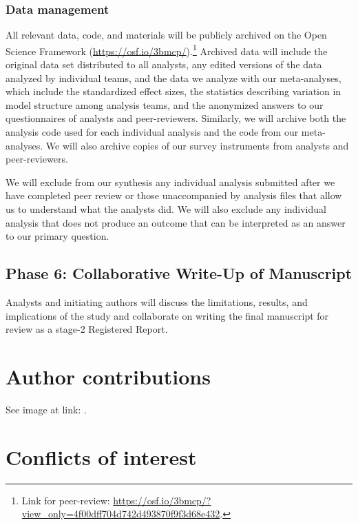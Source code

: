 \documentclass[Review,times,sageh]{sagej}
\begin{document}
\hypertarget{ana-archive}{%
\subsubsection{Data management}\label{ana-archive}}

All relevant data, code, and materials will be publicly archived on the Open Science Framework (\url{https://osf.io/3bmcp/}).\footnote{Link for peer-review: \url{https://osf.io/3bmcp/?view_only=4f00dff704d742d493870f9f3d68e432}.}
Archived data will include the original data set distributed to all analysts, any edited versions of the data analyzed by individual teams, and the data we analyze with our meta-analyses, which include the standardized effect sizes, the statistics describing variation in model structure among analysis teams, and the anonymized answers to our questionnaires of analysts and peer-reviewers.
Similarly, we will archive both the analysis code used for each individual analysis and the code from our meta-analyses.
We will also archive copies of our survey instruments from analysts and peer-reviewers.

We will exclude from our synthesis any individual analysis submitted after we have completed peer review or those unaccompanied by analysis files that allow us to understand what the analysts did.
We will also exclude any individual analysis that does not produce an outcome that can be interpreted as an answer to our primary question.

\hypertarget{phase-6-collaborative-write-up-of-manuscript}{%
\subsection{Phase 6: Collaborative Write-Up of Manuscript}\label{phase-6-collaborative-write-up-of-manuscript}}

Analysts and initiating authors will discuss the limitations, results, and implications of the study and collaborate on writing the final manuscript for review as a stage-2 Registered Report.

\hypertarget{author-contributions}{%
\section{Author contributions}\label{author-contributions}}

See image at link: .

\hypertarget{conflicts-of-interest}{%
\section{Conflicts of interest}\label{conflicts-of-interest}}
\end{document}

